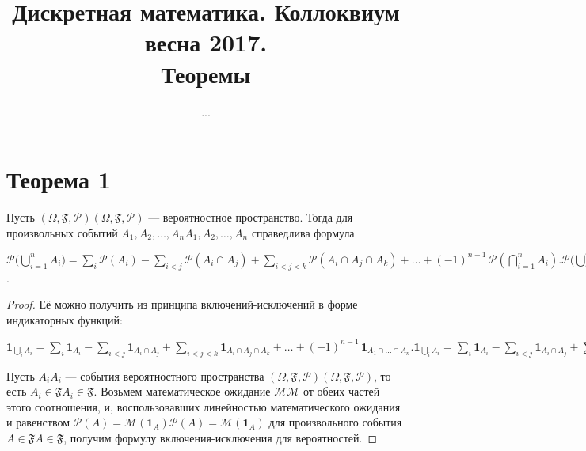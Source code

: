 \documentclass[a4paper,12pt]{article}
\begin{document}
	\title{Дискретная математика. Коллоквиум весна 2017. \\ Теоремы}
	\author{...}
	\maketitle
	\tableofcontents
    \pagebreak
    \section {Теорема 1}
    \begin{theorem}
   Пусть ${\displaystyle (\Omega ,{\mathfrak {F}},{\mathcal {P}})} (\Omega ,{\mathfrak {F}},{\mathcal {P}})$ — вероятностное пространство. Тогда для произвольных событий ${\displaystyle A_{1},A_{2},\ldots ,A_{n}} A_{1},A_{2},\ldots ,A_{n}$ справедлива формула

${\displaystyle {\mathcal {P}}{\biggl (}\bigcup _{i=1}^{n}A_{i}{\biggr )}=\sum _{i}{\mathcal {P}}(A_{i})-\sum _{i<j}{\mathcal {P}}(A_{i}\cap A_{j})+\sum _{i<j<k}{\mathcal {P}}(A_{i}\cap A_{j}\cap A_{k})+\ldots +(-1)^{n-1}\,{\mathcal {P}}\left(\bigcap _{i=1}^{n}A_{i}\right).} {\mathcal {P}}{\biggl (}\bigcup _{i=1}^{n}A_{i}{\biggr )}=\sum _{i}{\mathcal {P}}(A_{i})-\sum _{i<j}{\mathcal {P}}(A_{i}\cap A_{j})+\sum _{i<j<k}{\mathcal {P}}(A_{i}\cap A_{j}\cap A_{k})+\ldots +(-1)^{n-1}\,{\mathcal {P}}\left(\bigcap _{i=1}^{n}A_{i}\right)$.
    \end{theorem}
    \begin{proof}
    Её можно получить из принципа включений-исключений в форме индикаторных функций:

${\displaystyle \mathbf {1} _{\bigcup _{i}A_{i}}=\sum _{i}\mathbf {1} _{A_{i}}-\sum _{i<j}\mathbf {1} _{A_{i}\cap A_{j}}+\sum _{i<j<k}\mathbf {1} _{A_{i}\cap A_{j}\cap A_{k}}+\ldots +(-1)^{n-1}\,\mathbf {1} _{A_{1}\cap \ldots \cap A_{n}}.} \mathbf {1} _{\bigcup _{i}A_{i}}=\sum _{i}\mathbf {1} _{A_{i}}-\sum _{i<j}\mathbf {1} _{A_{i}\cap A_{j}}+\sum _{i<j<k}\mathbf {1} _{A_{i}\cap A_{j}\cap A_{k}}+\ldots +(-1)^{n-1}\,\mathbf {1} _{A_{1}\cap \ldots \cap A_{n}}.$

Пусть ${\displaystyle A_{i}} A_{i}$ — события вероятностного пространства ${\displaystyle (\Omega ,{\mathfrak {F}},{\mathcal {P}})} (\Omega ,{\mathfrak {F}},{\mathcal {P}})$, то есть ${\displaystyle A_{i}\in {\mathfrak {F}}} A_{i}\in {\mathfrak {F}}$. Возьмем математическое ожидание ${\displaystyle {\mathcal {M}}} {\mathcal {M}}$ от обеих частей этого соотношения, и, воспользовавших линейностью математического ожидания и равенством ${\displaystyle {\mathcal {P}}(A)={\mathcal {M}}(\mathbf {1} _{A})} {\mathcal {P}}(A)={\mathcal {M}}(\mathbf {1} _{A})$ для произвольного события ${\displaystyle A\in {\mathfrak {F}}} {\displaystyle A\in {\mathfrak {F}}}$, получим формулу включения-исключения для вероятностей.
    
    \end{proof}
    
\end{document}
